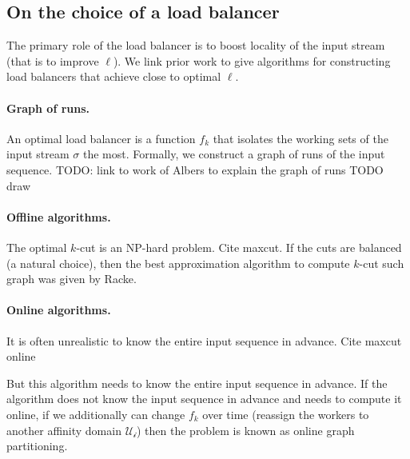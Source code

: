 
\subsection{On the choice of a load balancer}

The primary role of the load balancer is to boost locality of the input stream (that is to improve $\ell$).
We link prior work to give algorithms for constructing load balancers that achieve close to optimal $\ell$.


\paragraph*{Graph of runs.}
An optimal load balancer is a function $f_k$ that isolates the working sets of the input stream $\sigma$ the most. Formally, we construct a graph of runs of the input sequence. 
TODO: link to work of Albers to explain the graph of runs
TODO draw



\paragraph*{Offline algorithms.}
The optimal $k$-cut is an NP-hard problem.
Cite maxcut.
If the cuts are balanced (a natural choice), then the best approximation algorithm to compute $k$-cut such graph was given by Racke.

\paragraph*{Online algorithms.}
It is often unrealistic to know the entire input sequence in advance.
Cite maxcut online %

But this algorithm needs to know the entire input sequence in advance. If the algorithm does not know the input sequence in advance and needs to compute it online, if we additionally can change $f_k$ over time (reassign the workers to another affinity domain $\mathcal{U_i}$) then the problem is known as online graph partitioning.




